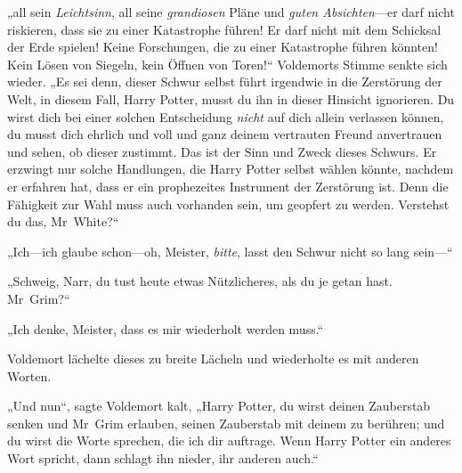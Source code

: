 „all sein \emph{Leichtsinn}, all seine \emph{grandiosen} Pläne und \emph{guten Absichten}—er darf nicht riskieren, dass sie zu einer Katastrophe führen! Er darf nicht mit dem Schicksal der Erde spielen! Keine Forschungen, die zu einer Katastrophe führen könnten! Kein Lösen von Siegeln, kein Öffnen von Toren!“
Voldemorts Stimme senkte sich wieder.
„Es sei denn, dieser Schwur selbst führt irgendwie in die Zerstörung der Welt, in diesem Fall, Harry Potter, musst du ihn in dieser Hinsicht ignorieren. Du wirst dich bei einer solchen Entscheidung \emph{nicht} auf dich allein verlassen können, du musst dich ehrlich und voll und ganz deinem vertrauten Freund anvertrauen und sehen, ob dieser zustimmt. Das ist der Sinn und Zweck dieses Schwurs. Er erzwingt nur solche Handlungen, die Harry Potter selbst wählen könnte, nachdem er erfahren hat, dass er ein prophezeites Instrument der Zerstörung ist. Denn die Fähigkeit zur Wahl muss auch vorhanden sein, um geopfert zu werden. Verstehst du das, Mr~White?“

„Ich—ich glaube schon—oh, Meister, \emph{bitte}, lasst den Schwur nicht so lang sein—“

„Schweig, Narr, du tust heute etwas Nützlicheres, als du je getan hast. Mr~Grim?“

„Ich denke, Meister, dass es mir wiederholt werden muss.“

Voldemort lächelte dieses zu breite Lächeln und wiederholte es mit anderen Worten.

„Und nun“, sagte Voldemort kalt, „Harry Potter, du wirst deinen Zauberstab senken und Mr~Grim erlauben, seinen Zauberstab mit deinem zu berühren; und du wirst die Worte sprechen, die ich dir auftrage. Wenn Harry Potter ein anderes Wort spricht, dann schlagt ihn nieder, ihr anderen auch.“


